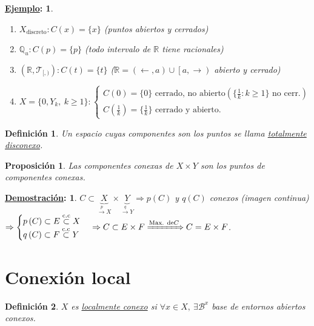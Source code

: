 \documentclass[10pt,a4paper,openright]{book}
\theoremstyle{break}
\newtheorem*{defi}{Definición}
\newtheorem*{prop}{Proposición}
\newtheorem*{demo}{\underline{Demostración}:}
\newtheorem*{ej}{\underline{Ejemplo}:}
\begin{document}
\begin{ej}
\begin{enumerate}
    \item $X_{\text{discreto}}: C\left( x \right) = \{x\}$ (puntos abiertos y cerrados)
    \item $\mathbb{Q}_u : C\left( p \right) = \{p\}$ (todo intervalo de $\mathbb{R}$ tiene racionales)
    \item $\left( \mathbb{R}, \mathcal{T}_{[, )} \right): C\left( t \right) = \{t\}$ ($\mathbb{R} = \left( \leftarrow, a \right) \cup \left[ a, \rightarrow \right)$ abierto y cerrado)
    \item $X = \{0, Y_k,\ k \ge 1\} : \begin{cases}
        C\left( 0 \right) = \{0\} \text{ cerrado, no abierto} \left( \{\frac{1}{k}: k\ge 1 \}  \text{ no cerr.}\right)\\
        C\left( \frac{1}{k} \right) = \{\frac{1}{k}\} \text{ cerrado y abierto.} 
    \end{cases} $
\end{enumerate}
\end{ej}

\begin{defi}
Un espacio cuyas componentes son los puntos se llama \underline{totalmente disconexo}. 
\end{defi}

\begin{prop}
Las componentes conexas de $X \times Y$ son los puntos de componentes conexas.
\end{prop}
\begin{demo}
$C \subset \underbrace{X}_{\xrightarrow{p} X} \times \underbrace{Y}_{\xrightarrow{q} Y} \Rightarrow p\left( C \right)$ y $q\left( C \right)$ conexos (imagen continua) $\Rightarrow \begin{cases}
    p\left( C \right) \subset E \stackrel{\text{c.c}}{\subset}  X\\
    q\left( C \right) \subset F \stackrel{\text{c.c}}{\subset}  Y
\end{cases} \Rightarrow C \subset E \times F \xRightarrow{\text{Max. de} C} C = E\times F$.
\end{demo}

\section{Conexión local}%
\label{sec:conexion_local}
\begin{defi}
$X$ es \underline{localmente conexo}  si $\forall x \in X,\ \exists \mathcal{B}^x$ base de entornos abiertos conexos.
\end{defi}
\end{document}
